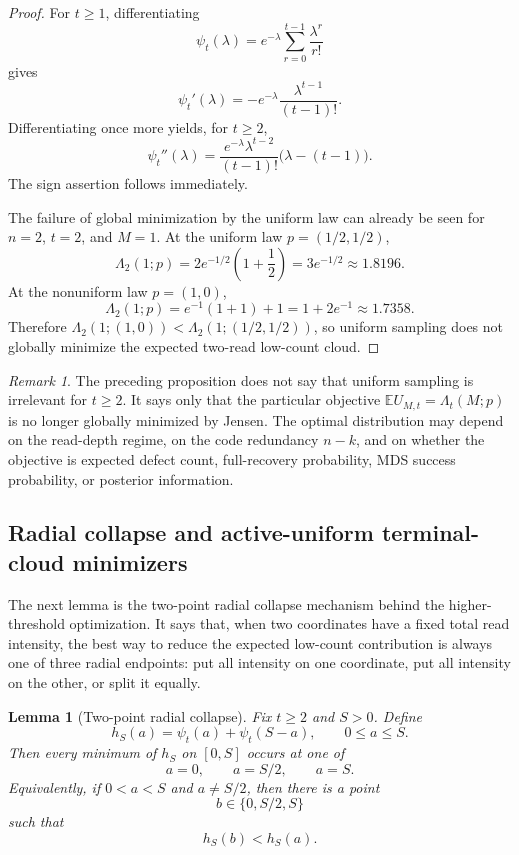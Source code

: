 \documentclass[11pt]{article}
\newtheorem{lemma}{Lemma}
\theoremstyle{definition}
\theoremstyle{remark}
\newtheorem{remark}{Remark}
\newcommand{\E}{\mathbb E}
\newcommand{\1}{\mathbf 1}
\begin{document}
\begin{proof}
For \(t\ge1\), differentiating
\[
  \psi_t(\lambda)=e^{-\lambda}\sum_{r=0}^{t-1}\frac{\lambda^r}{r!}
\]
gives
\[
  \psi_t'(\lambda)=-e^{-\lambda}\frac{\lambda^{t-1}}{(t-1)!}.
\]
Differentiating once more yields, for \(t\ge2\),
\[
  \psi_t''(\lambda)=
  \frac{e^{-\lambda}\lambda^{t-2}}{(t-1)!}\bigl(\lambda-(t-1)\bigr).
\]
The sign assertion follows immediately.

The failure of global minimization by the uniform law can already be seen for \(n=2\), \(t=2\), and \(M=1\).  At the uniform law \(p=(1/2,1/2)\),
\[
  \Lambda_2(1;p)=2e^{-1/2}\left(1+\frac12\right)=3e^{-1/2}\approx1.8196.
\]
At the nonuniform law \(p=(1,0)\),
\[
  \Lambda_2(1;p)=e^{-1}(1+1)+1=1+2e^{-1}\approx1.7358.
\]
Therefore \(\Lambda_2(1;(1,0))<\Lambda_2(1;(1/2,1/2))\), so uniform sampling does not globally minimize the expected two-read low-count cloud.
\end{proof}

\begin{remark}
The preceding proposition does not say that uniform sampling is irrelevant for \(t\ge2\).  It says only that the particular objective \(\E U_{M,t}=\Lambda_t(M;p)\) is no longer globally minimized by Jensen.  The optimal distribution may depend on the read-depth regime, on the code redundancy \(n-k\), and on whether the objective is expected defect count, full-recovery probability, MDS success probability, or posterior information.
\end{remark}

\subsection{Radial collapse and active-uniform terminal-cloud minimizers}

The next lemma is the two-point radial collapse mechanism behind the higher-threshold optimization.  It says that, when two coordinates have a fixed total read intensity, the best way to reduce the expected low-count contribution is always one of three radial endpoints: put all intensity on one coordinate, put all intensity on the other, or split it equally.

\begin{lemma}[Two-point radial collapse]\label{lem:two-point-radial-collapse}
Fix \(t\ge2\) and \(S>0\).  Define
\[
  h_S(a)=\psi_t(a)+\psi_t(S-a),\qquad 0\le a\le S.
\]
Then every minimum of \(h_S\) on \([0,S]\) occurs at one of
\[
  a=0,\qquad a=S/2,\qquad a=S.
\]
Equivalently, if \(0<a<S\) and \(a\ne S/2\), then there is a point
\[
  b\in\{0,S/2,S\}
\]
such that
\[
  h_S(b)<h_S(a).
\]
\end{lemma}
\end{document}
